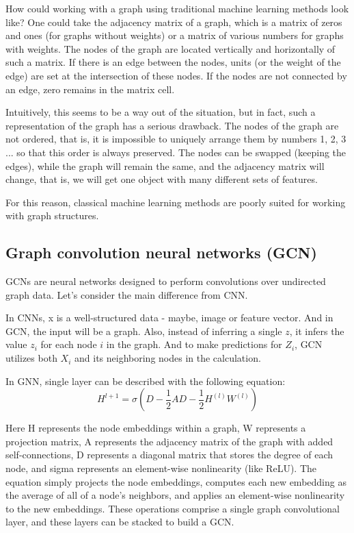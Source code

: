\documentclass[a4paper,14pt]{article}
\begin{document}

How could working with a graph using traditional machine learning methods look like? One could take the adjacency matrix of a graph, which is a matrix of zeros and ones (for graphs without weights) or a matrix of various numbers for graphs with weights. The nodes of the graph are located vertically and horizontally of such a matrix. If there is an edge between the nodes, units (or the weight of the edge) are set at the intersection of these nodes. If the nodes are not connected by an edge, zero remains in the matrix cell.

Intuitively, this seems to be a way out of the situation, but in fact, such a representation of the graph has a serious drawback. The nodes of the graph are not ordered, that is, it is impossible to uniquely arrange them by numbers 1, 2, 3 ... so that this order is always preserved. The nodes can be swapped (keeping the edges), while the graph will remain the same, and the adjacency matrix will change, that is, we will get one object with many different sets of features.

For this reason, classical machine learning methods are poorly suited for working with graph structures.

\subsection{Graph convolution neural networks (GCN)}
GCNs are neural networks designed to perform convolutions over undirected graph data. Let's consider the main difference from CNN.

In CNNs, x is a well-structured data - maybe, image or feature vector. And in GCN, the input will be a graph. Also, instead of inferring a single $z$, it infers the value $z_i$ for each node $i$ in the graph. And to make predictions for $Z_i$, GCN utilizes both $X_i$ and its neighboring nodes in the calculation.

In GNN, single layer can be described with the following equation:
\begin{equation}
H^{l+1} = \sigma(D - \frac{1}{2}AD - \frac{1}{2}H^{(l)}W^{(l)})
\end{equation}

Here H represents the node embeddings within a graph, W represents a projection matrix, A represents the adjacency matrix of the graph with added self-connections, D represents a diagonal matrix that stores the degree of each node, and sigma represents an element-wise nonlinearity (like ReLU). The equation simply projects the node embeddings, computes each new embedding as the average of all of a node’s neighbors, and applies an element-wise nonlinearity to the new embeddings. These operations comprise a single graph convolutional layer, and these layers can be stacked to build a GCN.
\end{document}
